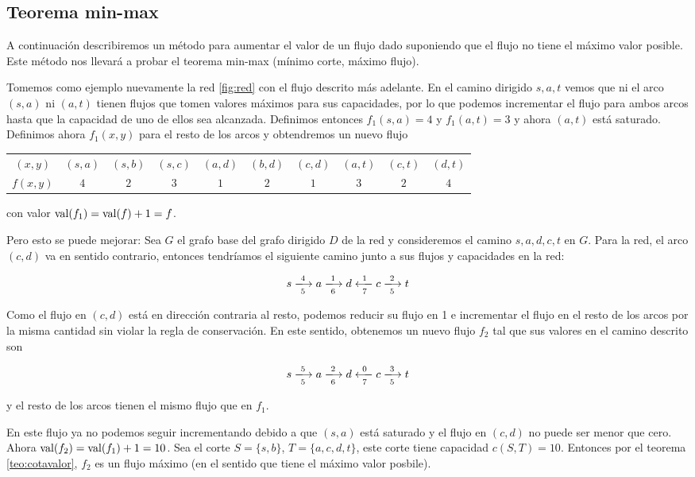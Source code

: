 \subsection{Teorema min-max}

A continuación describiremos un método para aumentar el valor de un flujo dado suponiendo que el flujo no tiene el máximo valor posible. Este método nos llevará a probar el teorema min-max (mínimo corte, máximo flujo).

Tomemos como ejemplo nuevamente la red \ref{fig:red} con el flujo descrito más adelante. En el camino dirigido $s, a, t$ vemos que ni el arco $(s,a)$ ni $(a,t)$ tienen flujos que tomen valores máximos para sus capacidades, por lo que podemos incrementar el flujo para ambos arcos hasta que la capacidad de uno de ellos sea alcanzada. Definimos entonces $f_1(s,a) = 4$ y $f_1(a,t) = 3$ y ahora $(a,t)$ está saturado. Definimos ahora $f_1(x,y)$ para el resto de los arcos y obtendremos un nuevo flujo

\begin{tabular}{c|ccccccccc}
    $(x,y)$  & $(s,a)$ & $(s,b)$ & $(s,c)$ & $(a,d)$ & $(b,d)$ & $(c,d)$ & $(a,t)$ & $(c,t)$ & $(d,t)$ \\
    $f(x,y)$ & $4$ & $2$ & $3$ & $1$ & $2$ & $1$ & $3$ & $2$ & $4$
\end{tabular}

\noindent con valor $\operatorname{val}(f_1) = \operatorname{val}(f) + 1 = f$.

Pero esto se puede mejorar: Sea $G$ el grafo base del grafo dirigido $D$ de la red y consideremos el camino $s, a, d, c, t$  en $G$. Para la red, el arco $(c,d)$ va en sentido contrario, entonces tendríamos el siguiente camino junto a sus flujos y capacidades en la red:

\[
s \xlongrightarrow[5]{4} a \xlongrightarrow[6]{1} d \xlongleftarrow[7]{1} c \xlongrightarrow[5]{2} t
\]

Como el flujo en $(c,d)$ está en dirección contraria al resto, podemos reducir su flujo en 1 e incrementar el flujo en el resto de los arcos por la misma cantidad sin violar la regla de conservación. En este sentido, obtenemos un nuevo flujo $f_2$ tal que sus valores en el camino descrito son

\[
s \xlongrightarrow[5]{5} a \xlongrightarrow[6]{2} d \xlongleftarrow[7]{0} c \xlongrightarrow[5]{3} t
\]

\noindent y el resto de los arcos tienen el mismo flujo que en $f_1$.

En este flujo ya no podemos seguir incrementando debido a que $(s,a)$ está saturado y el flujo en $(c,d)$ no puede ser menor que cero. Ahora $\operatorname{val}(f_2) = \operatorname{val}(f_1) + 1 = 10$. Sea el corte $S = \{s,b\}$, $T=\{a,c,d,t\}$, este corte tiene capacidad $c(S,T)=10$. Entonces por el teorema \ref{teo:cotavalor}, $f_2$ es un flujo máximo (en el sentido que tiene el máximo valor posbile).

